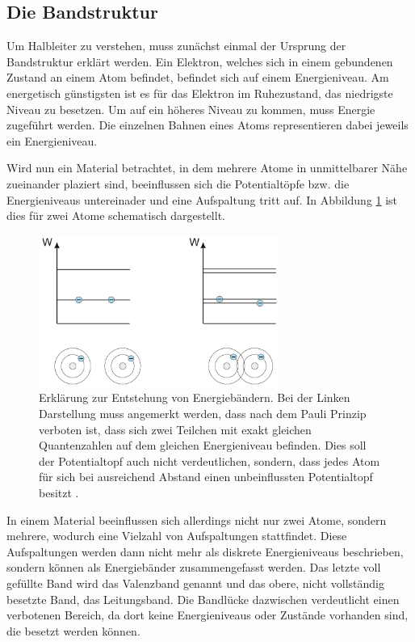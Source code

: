\subsection{Die Bandstruktur}
\label{sec:bandstruktur}

Um Halbleiter zu verstehen, muss zunächst einmal der Ursprung der Bandstruktur
erklärt werden. Ein Elektron, welches sich in einem gebundenen Zustand an einem 
Atom befindet, befindet sich auf einem Energieniveau. Am energetisch günstigsten
ist es für das Elektron im Ruhezustand, das niedrigste Niveau zu besetzen. Um auf
ein höheres Niveau zu kommen, muss Energie zugeführt werden. Die einzelnen Bahnen
eines Atoms representieren dabei jeweils ein Energieniveau. \par

Wird nun ein Material betrachtet, in dem mehrere Atome in unmittelbarer
Nähe zueinander plaziert sind, beeinflussen sich die Potentialtöpfe bzw. die
Energieniveaus untereinader und eine Aufspaltung tritt auf. In Abbildung
\ref{fig:bandstruktur} ist dies für zwei Atome schematisch dargestellt.


\begin{figure}
  \centering
  \includegraphics[width=0.7\textwidth]{content/graphics/bandstruktur.png}
  \caption{Erklärung zur Entstehung von Energiebändern. Bei der Linken Darstellung
  muss angemerkt werden, dass nach dem Pauli Prinzip verboten ist, dass sich
  zwei Teilchen mit exakt gleichen Quantenzahlen auf dem gleichen Energieniveau
  befinden. Dies soll der Potentialtopf auch nicht verdeutlichen, sondern, dass
  jedes Atom für sich bei ausreichend Abstand einen unbeinflussten
  Potentialtopf besitzt \cite{BANDSTRUKTUR}.}
  \label{fig:bandstruktur}
\end{figure}

In einem Material beeinflussen sich allerdings nicht nur zwei Atome, sondern
mehrere, wodurch eine Vielzahl von Aufspaltungen stattfindet. Diese
Aufspaltungen werden dann nicht mehr als diskrete Energieniveaus beschrieben,
sondern können als Energiebänder zusammengefasst werden. Das letzte voll
gefüllte Band wird das Valenzband genannt und das obere, nicht vollständig
besetzte Band, das Leitungsband. Die Bandlücke dazwischen verdeutlicht einen
verbotenen Bereich, da dort keine Energieniveaus oder Zustände vorhanden sind,
die besetzt werden können.
